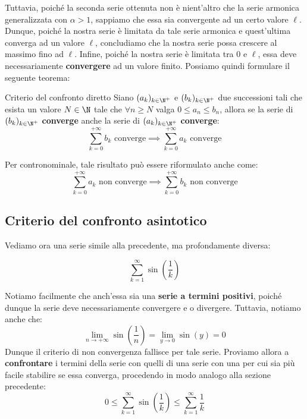 \documentclass[a4paper, 12pt]{report}
\begin{document}
    Tuttavia, poiché la seconda serie ottenuta non è nient'altro che la serie armonica generalizzata con $\alpha > 1$, sappiamo che essa sia convergente ad un certo valore $\ell$. Dunque, poiché la nostra serie è limitata da tale serie armonica e quest'ultima converga ad un valore $\ell$, concludiamo che la nostra serie possa crescere al massimo fino ad $\ell$. Infine, poiché la nostra serie è limitata tra 0 e $\ell$, essa deve necessariamente \textbf{convergere} ad un valore finito. Possiamo quindi formulare il seguente teorema:
    
    \begin{framedthm}{Criterio del confronto diretto}
        Siano $(a_k)_{k \in \N^+}$ e $(b_k)_{k \in \N^+}$ due successioni tali che esista un valore $N \in \N$ tale che $\forall n \geq N$ valga $0 \leq a_n \leq b_n$, allora se la serie di $(b_k)_{k \in \N^+}$ \textbf{converge} anche la serie di $(a_k)_{k \in \N^+}$ \textbf{converge}:
        \[\sum_{k = 0}^{+\infty} b_k \text{ converge} \implies \sum_{k = 0}^{+\infty} a_k \text{ converge}\]
    \end{framedthm}

    Per contronominale, tale risultato può essere riformulato anche come:
    \[\sum_{k = 0}^{+\infty} a_k \text{ non converge} \implies \sum_{k = 0}^{+\infty} b_k \text{ non converge}\]
    
    \quad

    \subsection{Criterio del confronto asintotico}
    
    Vediamo ora una serie simile alla precedente, ma profondamente diversa:
    
    \[\sum_{k=1}^{\infty} \sin \left ( \frac{1}{k} \right )\]
    
    Notiamo facilmente che anch'essa sia una \textbf{serie a termini positivi}, poiché dunque la serie deve necessariamente convergere e o divergere. Tuttavia, notiamo anche che:
    \[\lim_{n \to +\infty} \sin \left ( \frac{1}{n}\right ) = \lim_{y \to 0} \sin \left ( y \right ) = 0\]
    Dunque il criterio di non convergenza fallisce per tale serie. Proviamo allora a \textbf{confrontare} i termini della serie con quelli di una serie con una per cui sia più facile stabilire se essa converga, procedendo in modo analogo alla sezione precedente:
    \[ 0 \leq \sum_{k=1}^{\infty} \sin \left ( \frac{1}{k} \right ) \leq \sum_{k=1}^{\infty} \frac{1}{k}\]
    
\end{document}
